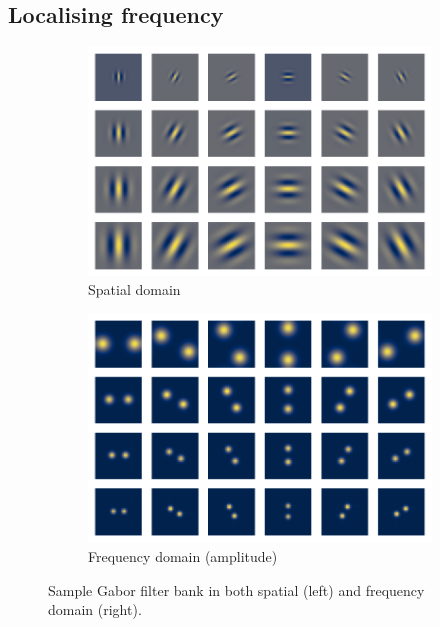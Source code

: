 \subsection{Localising frequency}
\begin{figure}
\begin{subfigure}{0.49\textwidth}
	\centering
	\includegraphics[width=1\textwidth]{figures/theory/gabor_sample}
	\caption{Spatial domain}
\end{subfigure}
\begin{subfigure}{0.49\textwidth}
	\centering
	\includegraphics[width=1\textwidth]{figures/theory/gabor_sample_f}
	\caption{Frequency domain (amplitude)}
\end{subfigure}
\caption{Sample Gabor filter bank in both spatial (left) and frequency domain (right).}\label{fig:gabor-sample}
\end{figure}

